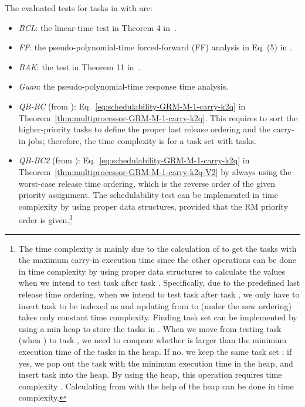 \documentclass[10pt,conference]{IEEEtran}
\newcommand{\frameworkkq}[1]{}
\begin{document}
The evaluated tests for  tasks in  with  are:
\begin{itemize}
\item \emph{BCL}: the linear-time test in Theorem 4 in~\cite{bertogna2006new}.
\item \emph{FF}: the pseudo-polynomial-time forced-forward (FF) analysis in Eq. (5) in \cite{DBLP:journals/rts/BaruahBMS10}.
\item \emph{BAK}: the  test in Theorem 11 in~\cite{baker2006analysis}.
\item \emph{Guan}: the pseudo-polynomial-time response time analysis\cite{DBLP:conf/rtss/GuanSYY09}.
\item \emph{QB-BC} (from \frameworkkq{}):
  Eq.~\eqref{eq:schedulability-GRM-M-1-carry-k2q} in
  Theorem~\ref{thm:multiprocessor-GRM-M-1-carry-k2q}. This requires to
  sort the higher-priority tasks to define the proper last release
  ordering and the  carry-in jobs; therefore, the time complexity is  for a
  task set with  tasks.
\item \emph{QB-BC2} (from \frameworkkq{}):
  Eq.~\eqref{eq:schedulability-GRM-M-1-carry-k2q} in
  Theorem~\ref{thm:multiprocessor-GRM-M-1-carry-k2q-V2} by always
  using the worst-case release time ordering, which is the reverse
  order of the given priority assignment. The schedulability test can
  be implemented in  time complexity by using proper data
  structures, provided that the RM priority order is given.\footnote{The time complexity is mainly due to the
    calculation of  to get the  tasks with the maximum
    carry-in execution time since the other operations can be done in
     time complexity by using proper data structures to
    calculate the values when we intend to test task 
    after task . Specifically, due to the predefined last
    release time ordering, when we intend to test task 
    after task , we only have to insert task  to be
    indexed as  and updating from   to  (under the new ordering) takes only constant time
    complexity.  Finding task set  can be implemented by
    using a min heap to store the  tasks in . When we move
    from testing task  (when ) to task ,
    we need to compare whether  is larger than the minimum
    execution time of the tasks in the heap. If no, we keep the same
    task set ; if yes, we pop out the task with the minimum
    execution time in the heap, and insert task  into the
    heap.  By using the heap, this operation requires time complexity
    . Calculating  from  with
    the help of the heap can be done in  time complexity. }
\end{itemize}
\end{document}
